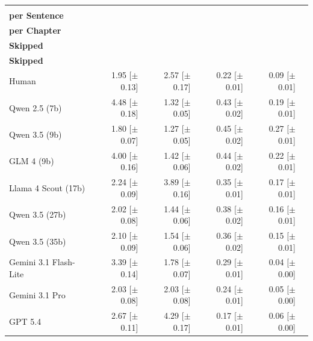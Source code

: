 \documentclass{article} %
\begin{document}
\begin{table}
  \centering
  \small
  \begin{tabular}{lrrrrr}
    \textbf{} & \makecell{\textbf{Avg. Chapters}\\\textbf{per Sentence}} & \makecell{\textbf{Avg. Sentences}\\\textbf{per Chapter}} & \makecell{\textbf{Prop. Chapters}\\\textbf{Skipped}} & \makecell{\textbf{Prop. Sentences}\\\textbf{Skipped}} \\
    \midrule
    Human & 1.95 [$\pm$ 0.13] & 2.57 [$\pm$ 0.17] & 0.22 [$\pm$ 0.01] & 0.09 [$\pm$ 0.01] \\
    \midrule
    Qwen 2.5 (7b) & \cellcolor{palegreen}4.48 [$\pm$ 0.18] & \cellcolor{palered}1.32 [$\pm$ 0.05] & \cellcolor{palegreen}0.43 [$\pm$ 0.02] & \cellcolor{palegreen}0.19 [$\pm$ 0.01] \\
    Qwen 3.5 (9b) & \cellcolor{palered}1.80 [$\pm$ 0.07] & \cellcolor{palered}1.27 [$\pm$ 0.05] & \cellcolor{palegreen}0.45 [$\pm$ 0.02] & \cellcolor{palegreen}0.27 [$\pm$ 0.01] \\
    GLM 4 (9b) & \cellcolor{palegreen}4.00 [$\pm$ 0.16] & \cellcolor{palered}1.42 [$\pm$ 0.06] & \cellcolor{palegreen}0.44 [$\pm$ 0.02] & \cellcolor{palegreen}0.22 [$\pm$ 0.01] \\
    Llama 4 Scout (17b) & \cellcolor{palegreen}2.24 [$\pm$ 0.09] & \cellcolor{palegreen}3.89 [$\pm$ 0.16] & \cellcolor{palegreen}0.35 [$\pm$ 0.01] & \cellcolor{palegreen}0.17 [$\pm$ 0.01] \\
    Qwen 3.5 (27b) & \cellcolor{palegreen}2.02 [$\pm$ 0.08] & \cellcolor{palered}1.44 [$\pm$ 0.06] & \cellcolor{palegreen}0.38 [$\pm$ 0.02] & \cellcolor{palegreen}0.16 [$\pm$ 0.01] \\
    Qwen 3.5 (35b) & \cellcolor{palegreen}2.10 [$\pm$ 0.09] & \cellcolor{palered}1.54 [$\pm$ 0.06] & \cellcolor{palegreen}0.36 [$\pm$ 0.02] & \cellcolor{palegreen}0.15 [$\pm$ 0.01] \\
    Gemini 3.1 Flash-Lite & \cellcolor{palegreen}3.39 [$\pm$ 0.14] & \cellcolor{palered}1.78 [$\pm$ 0.07] & \cellcolor{palegreen}0.29 [$\pm$ 0.01] & \cellcolor{palered}0.04 [$\pm$ 0.00] \\
    Gemini 3.1 Pro & \cellcolor{palegreen}2.03 [$\pm$ 0.08] & \cellcolor{palered}2.03 [$\pm$ 0.08] & \cellcolor{palegreen}0.24 [$\pm$ 0.01] & \cellcolor{palered}0.05 [$\pm$ 0.00] \\
    GPT 5.4 & \cellcolor{palegreen}2.67 [$\pm$ 0.11] & \cellcolor{palegreen}4.29 [$\pm$ 0.17] & \cellcolor{palered}0.17 [$\pm$ 0.01] & \cellcolor{palered}0.06 [$\pm$ 0.00] \\

\end{tabular}
\end{table}
\end{document}
